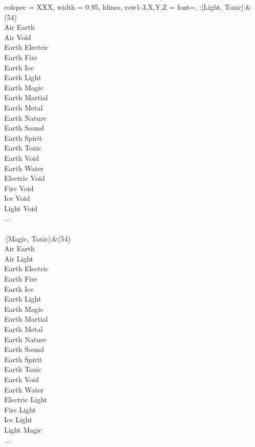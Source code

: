 \begin{longtblr}[
	caption = {2v2 Defending Weak},
	label = {2v2-Defending-Weak},
]{
	colspec = {XXX}, width = 0.95\linewidth,
	hlines,
	row{1-3,X,Y,Z} = {font=\bfseries},
}
	:[Light, Toxic]:&{(54)\\
	Air Earth \\
	Air Void \\
	Earth Electric \\
	Earth Fire \\
	Earth Ice \\
	Earth Light \\
	Earth Magic \\
	Earth Martial \\
	Earth Metal \\
	Earth Nature \\
	Earth Sound \\
	Earth Spirit \\
	Earth Toxic \\
	Earth Void \\
	Earth Water \\
	Electric Void \\
	Fire Void \\
	Ice Void \\
	Light Void \\
	...\\
	}\\

	:[Magic, Toxic]:&{(54)\\
	Air Earth \\
	Air Light \\
	Earth Electric \\
	Earth Fire \\
	Earth Ice \\
	Earth Light \\
	Earth Magic \\
	Earth Martial \\
	Earth Metal \\
	Earth Nature \\
	Earth Sound \\
	Earth Spirit \\
	Earth Toxic \\
	Earth Void \\
	Earth Water \\
	Electric Light \\
	Fire Light \\
	Ice Light \\
	Light Magic \\
	...\\
	}\\


\end{longtblr}
